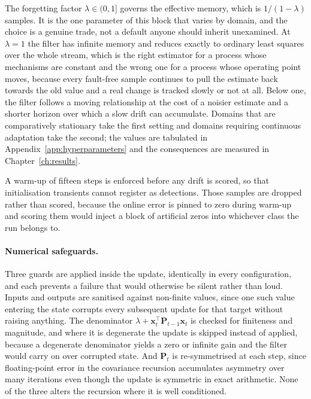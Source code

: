 The forgetting factor $\lambda \in (0, 1]$ governs the effective memory, which is $1/(1-\lambda)$ samples. It is the one parameter of this block that varies by domain, and the choice is a genuine trade, not a default anyone should inherit unexamined. At $\lambda = 1$ the filter has infinite memory and reduces exactly to ordinary least squares over the whole stream, which is the right estimator for a process whose mechanisms are constant and the wrong one for a process whose operating point moves, because every fault-free sample continues to pull the estimate back towards the old value and a real change is tracked slowly or not at all. Below one, the filter follows a moving relationship at the cost of a noisier estimate and a shorter horizon over which a slow drift can accumulate. Domains that are comparatively stationary take the first setting and domains requiring continuous adaptation take the second; the values are tabulated in Appendix~\ref{app:hyperparameters} and the consequences are measured in Chapter~\ref{ch:results}.

A warm-up of fifteen steps is enforced before any drift is scored, so that initialisation transients cannot register as detections. Those samples are dropped rather than scored, because the online error is pinned to zero during warm-up and scoring them would inject a block of artificial zeros into whichever class the run belongs to.

\paragraph{Numerical safeguards.} Three guards are applied inside the update, identically in every configuration, and each prevents a failure that would otherwise be silent rather than loud. Inputs and outputs are sanitised against non-finite values, since one such value entering the state corrupts every subsequent update for that target without raising anything. The denominator $\lambda + \mathbf{x}_t^{\top}\mathbf{P}_{t-1}\mathbf{x}_t$ is checked for finiteness and magnitude, and where it is degenerate the update is skipped instead of applied, because a degenerate denominator yields a zero or infinite gain and the filter would carry on over corrupted state. And $\mathbf{P}_t$ is re-symmetrised at each step, since floating-point error in the covariance recursion accumulates asymmetry over many iterations even though the update is symmetric in exact arithmetic. None of the three alters the recursion where it is well conditioned.

